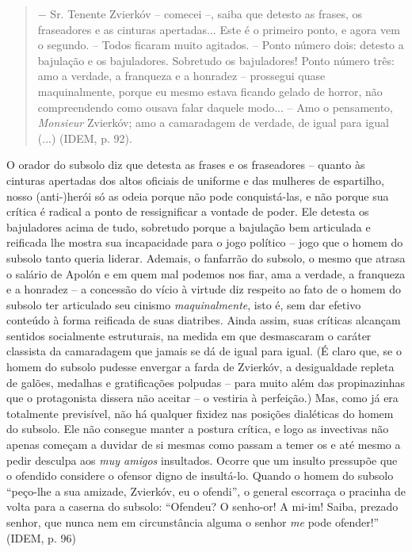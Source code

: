 \begin{quote}
− Sr. Tenente Zvierkóv -- comecei --, saiba que detesto as frases, os
fraseadores e as cinturas apertadas... Este é o primeiro ponto, e agora
vem o segundo. -- Todos ficaram muito agitados. -- Ponto número dois:
detesto a bajulação e os bajuladores. Sobretudo os bajuladores! Ponto
número três: amo a verdade, a franqueza e a honradez -- prossegui quase
maquinalmente, porque eu mesmo estava ficando gelado de horror, não
compreendendo como ousava falar daquele modo... -- Amo o pensamento,
\emph{Monsieur} Zvierkóv; amo a camaradagem de verdade, de igual para
igual (...) (IDEM, p. 92).
\end{quote}

O orador do subsolo diz que detesta as frases e os fraseadores -- quanto
às cinturas apertadas dos altos oficiais de uniforme e das mulheres de
espartilho, nosso (anti-)herói só as odeia porque não pode
conquistá-las, e não porque sua crítica é radical a ponto de
ressignificar a vontade de poder. Ele detesta os bajuladores acima de
tudo, sobretudo porque a bajulação bem articulada e reificada lhe mostra
sua incapacidade para o jogo político -- jogo que o homem do subsolo
tanto queria liderar. Ademais, o fanfarrão do subsolo, o mesmo que
atrasa o salário de Apolón e em quem mal podemos nos fiar, ama a
verdade, a franqueza e a honradez -- a concessão do vício à virtude diz
respeito ao fato de o homem do subsolo ter articulado seu cinismo
\emph{maquinalmente}, isto é, sem dar efetivo conteúdo à forma reificada
de suas diatribes. Ainda assim, suas críticas alcançam sentidos
socialmente estruturais, na medida em que desmascaram o caráter
classista da camaradagem que jamais se dá de igual para igual. (É claro
que, se o homem do subsolo pudesse envergar a farda de Zvierkóv, a
desigualdade repleta de galões, medalhas e gratificações polpudas --
para muito além das propinazinhas que o protagonista dissera não aceitar
-- o vestiria à perfeição.) Mas, como já era totalmente previsível, não
há qualquer fixidez nas posições dialéticas do homem do subsolo. Ele não
consegue manter a postura crítica, e logo as invectivas não apenas
começam a duvidar de si mesmas como passam a temer os e até mesmo a
pedir desculpa aos \emph{muy amigos} insultados. Ocorre que um insulto
pressupõe que o ofendido considere o ofensor digno de insultá-lo. Quando
o homem do subsolo ``peço-lhe a sua amizade, Zvierkóv, eu o ofendi'', o
general escorraça o pracinha de volta para a caserna do subsolo:
``Ofendeu? O senho-or! A mi-im! Saiba, prezado senhor, que nunca nem em
circunstância alguma o senhor \emph{me} pode ofender!'' (IDEM, p. 96)


